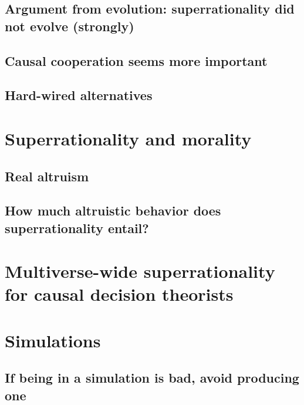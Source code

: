 \documentclass{book}
\begin{document}
\subsection{Argument from evolution: superrationality did not evolve (strongly)}
\label{Argument from evolution: superrationality did not evolve (strongly)}

\subsection{Causal cooperation seems more important}
\label{Causal cooperation seems more important}

\subsection{Hard-wired alternatives}
\label{Hard-wired alternatives}

\section{Superrationality and morality}
\label{Superrationality and morality}

\subsection{Real altruism}
\label{Real altruism}

\subsection{How much altruistic behavior does superrationality entail?}
\label{How much altruistic behavior does superrationality entail?}

\section{Multiverse-wide superrationality for causal decision theorists}
\label{Multiverse-wide superrationality for causal decision theorists}

\section{Simulations}
\label{Simulations}

\subsection{If being in a simulation is bad, avoid producing one}
\label{If being in a simulation is bad, avoid producing one}
\end{document}
